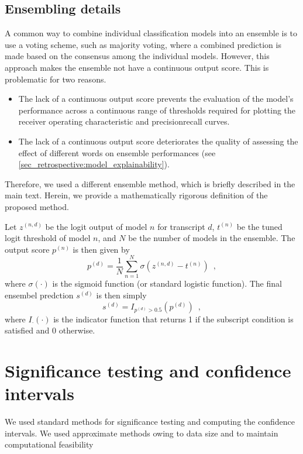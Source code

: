 {\subsection{Ensembling details}

A common way to combine individual classification models into an ensemble is to use a voting scheme, such as majority voting, where a combined prediction is made based on the consensus among the individual models. However, this approach makes the ensemble not have a continuous output score. This is problematic for two reasons.
%
\begin{itemize}
    \item The lack of a continuous output score prevents the evaluation of the model's performance across a continuous range of thresholds required for plotting the receiver operating characteristic and precisionrecall curves.
    \item The lack of a continuous output score deteriorates the quality of assessing the effect of different words on ensemble performances (see \cref{sec_retrospective:model_explainability}).
\end{itemize}
%
Therefore, we used a different ensemble method, which is briefly described in the main text. Herein, we provide a mathematically rigorous definition of the proposed method.

Let $z^{(n,d)}$ be the logit output of model $n$ for transcript $d$, $t^{(n)}$ be the tuned logit threshold of model $n$, and $N$ be the number of models in the ensemble. The output score $p^{(n)}$ is then given by 
%
\begin{equation}
    p^{(d)} = \frac{1}{N} \sum_{n=1}^N \sigma\left(z^{(n,d)} - t^{(n)}\right) \enspace ,
\end{equation}
%
where $\sigma(\cdot)$ is the sigmoid function (or standard logistic function). The final ensembel predction $s^{(d)}$ is then simply 
%
\begin{equation}
    s^{(d)} = I_{p^{(d)} > 0.5}\left(p^{(d)}\right) \enspace ,
\end{equation}
%
where $I_{\cdot}(\cdot)$ is the indicator function that returns 1 if the subscript condition is satisfied and 0 otherwise. 


\section{Significance testing and confidence intervals}

We used standard methods for significance testing and computing the confidence intervals. We used approximate methods owing to data size and to maintain computational feasibility \parencite{dwass_modified_1957,eden_validity_1933}

}
